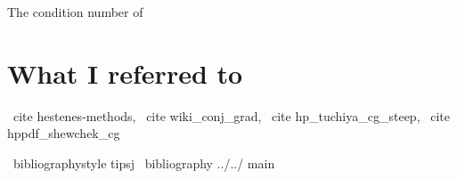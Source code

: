 





The condition number of%




\fi




\section{What I referred to}

\ cite {hestenes-methods}, \ cite {wiki_conj_grad}, \ cite {hp_tuchiya_cg_steep}, \ cite {hppdf_shewchek_cg}

\ bibliographystyle {tipsj}
\ bibliography {../../ main}
\fi



